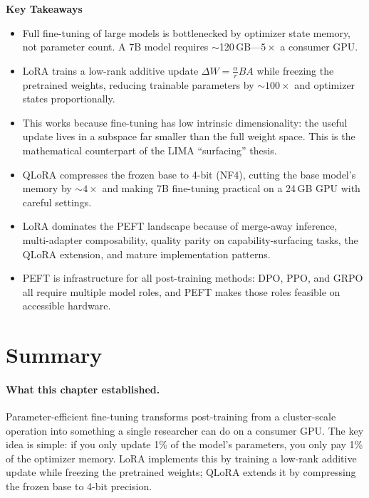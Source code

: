 \begin{takeaways}
\textbf{Key Takeaways}
\begin{itemize}[nosep]
  \item Full fine-tuning of large models is bottlenecked by optimizer state memory, not parameter count. A 7B model requires $\sim$120\,GB---$5\times$ a consumer GPU.
  \item LoRA trains a low-rank additive update $\Delta W = \frac{\alpha}{r} BA$ while freezing the pretrained weights, reducing trainable parameters by $\sim$$100\times$ and optimizer states proportionally.
  \item This works because fine-tuning has low intrinsic dimensionality: the useful update lives in a subspace far smaller than the full weight space. This is the mathematical counterpart of the LIMA ``surfacing'' thesis.
  \item QLoRA compresses the frozen base to 4-bit (NF4), cutting the base model's memory by $\sim$$4\times$ and making 7B fine-tuning practical on a 24\,GB GPU with careful settings.
  \item LoRA dominates the PEFT landscape because of merge-away inference, multi-adapter composability, quality parity on capability-surfacing tasks, the QLoRA extension, and mature implementation patterns.
  \item PEFT is infrastructure for all post-training methods: DPO, PPO, and GRPO all require multiple model roles, and PEFT makes those roles feasible on accessible hardware.
\end{itemize}
\end{takeaways}


\section*{Summary}

\paragraph{What this chapter established.} Parameter-efficient fine-tuning transforms post-training from a cluster-scale operation into something a single researcher can do on a consumer GPU. The key idea is simple: if you only update 1\% of the model's parameters, you only pay 1\% of the optimizer memory. LoRA implements this by training a low-rank additive update while freezing the pretrained weights; QLoRA extends it by compressing the frozen base to 4-bit precision.

